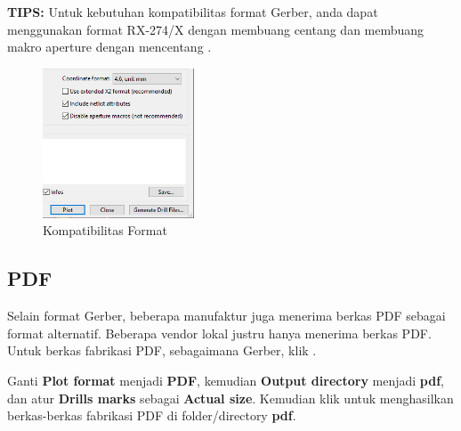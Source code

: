 \documentclass[12pt]{book}
\begin{document}
	\textbf{TIPS:} Untuk kebutuhan kompatibilitas format Gerber, anda dapat menggunakan format RX-274/X dengan membuang centang 
	dan membuang makro aperture dengan mencentang .

	\begin{figure}[!ht]
		\centering
		\includegraphics[width=0.4\textwidth]{images/fab/fab_0_alt}
		\caption{Kompatibilitas Format}
	\end{figure}

	\newpage
	\subsection{PDF}

	Selain format Gerber, beberapa manufaktur juga menerima berkas PDF sebagai format alternatif.
	Beberapa vendor lokal justru hanya menerima berkas PDF.
	Untuk berkas fabrikasi PDF, sebagaimana Gerber, klik .

	Ganti \textbf{Plot format} menjadi \textbf{PDF},
	kemudian \textbf{Output directory} menjadi \textbf{pdf},
	dan atur \textbf{Drills marks} sebagai \textbf{Actual size}.
	Kemudian klik  untuk menghasilkan berkas-berkas fabrikasi PDF di folder/directory \textbf{pdf}.
\end{document}
